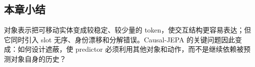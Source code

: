 
\subsection{本章小结}

对象表示把可移动实体变成较稳定、较少量的 token，使交互结构更容易表达；但它同时引入 slot 无序、身份漂移和分解错误。Causal-JEPA 的关键问题因此变成：如何设计遮蔽，使 predictor 必须利用其他对象和动作，而不是继续依赖被预测对象自身的历史？

